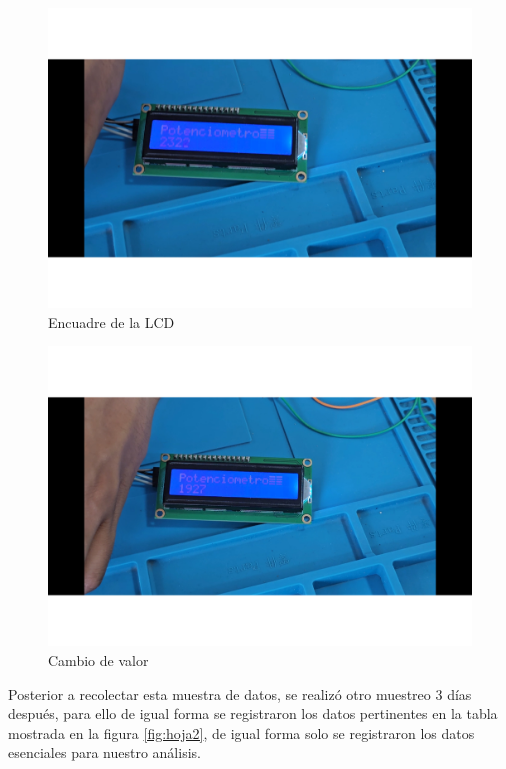     
    \begin{figure}[H]
        \centering
        \includegraphics[trim =  {25mm 25mm 25mm 10mm},clip,scale=0.3]{22/Img/e17.pdf}
        \caption{Encuadre de la LCD}
        \label{fig:evi7}
    \end{figure}
    
    
    \begin{figure}[H]
        \centering
        \includegraphics[trim =  {25mm 25mm 25mm 10mm},clip,scale=0.3]{22/Img/e20.pdf}
        \caption{Cambio de valor}
        \label{fig:evi8}
    \end{figure}
    
    Posterior a recolectar esta muestra de datos, se realizó otro muestreo 3 días después, para ello de igual forma se registraron los datos pertinentes en la tabla mostrada en la figura \ref{fig:hoja2}, de igual forma solo se registraron los datos esenciales para nuestro análisis.
    
